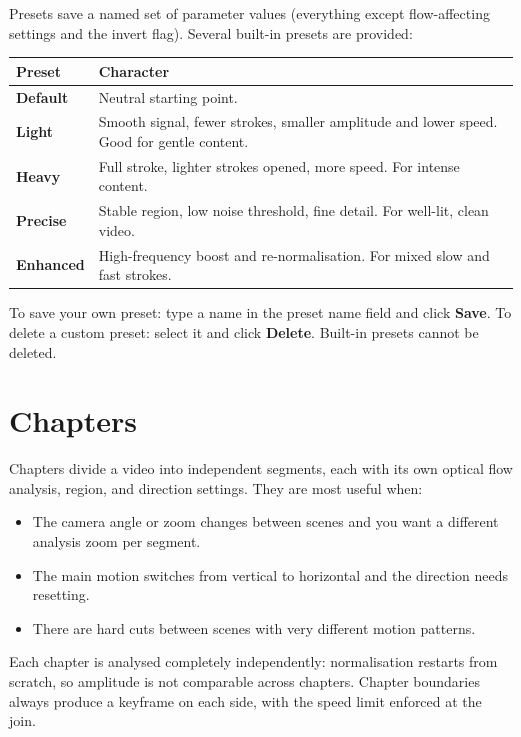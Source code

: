 \documentclass[11pt,a4paper]{article}
\begin{document}
Presets save a named set of parameter values (everything except flow-affecting settings and the invert flag). Several built-in presets are provided:

\begin{center}
\begin{tabular}{lp{9.5cm}}
  \toprule
  Preset & Character \\
  \midrule
  \textbf{Default}   & Neutral starting point. \\
  \textbf{Light}     & Smooth signal, fewer strokes, smaller amplitude and lower speed. Good for gentle content. \\
  \textbf{Heavy}     & Full stroke, lighter strokes opened, more speed. For intense content. \\
  \textbf{Precise}   & Stable region, low noise threshold, fine detail. For well-lit, clean video. \\
  \textbf{Enhanced}  & High-frequency boost and re-normalisation. For mixed slow and fast strokes. \\
  \bottomrule
\end{tabular}
\end{center}

To save your own preset: type a name in the preset name field and click \textbf{Save}. To delete a custom preset: select it and click \textbf{Delete}. Built-in presets cannot be deleted.

\section{Chapters}
\label{sec:chapters}

Chapters divide a video into independent segments, each with its own optical flow analysis, region, and direction settings. They are most useful when:

\begin{itemize}[noitemsep]
  \item The camera angle or zoom changes between scenes and you want a different analysis zoom per segment.
  \item The main motion switches from vertical to horizontal and the direction needs resetting.
  \item There are hard cuts between scenes with very different motion patterns.
\end{itemize}

Each chapter is analysed completely independently: normalisation restarts from scratch, so amplitude is not comparable across chapters. Chapter boundaries always produce a keyframe on each side, with the speed limit enforced at the join.
\end{document}
